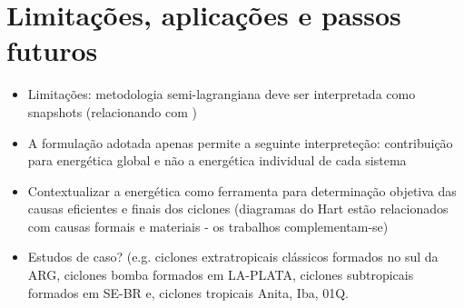 \section{Limitações, aplicações e passos futuros}
\begin{itemize}
    \item Limitações: metodologia semi-lagrangiana deve ser interpretada como snapshots (relacionando com \citet{muench1965dynamics})
    \item  A formulação adotada apenas permite a seguinte interpreteção: contribuição para energética global e não a energética individual de cada sistema
    \item Contextualizar a energética como ferramenta para determinação objetiva das causas eficientes e finais dos ciclones (diagramas do Hart estão relacionados com causas formais e materiais - os trabalhos complementam-se)
    \item Estudos de caso? (e.g. ciclones extratropicais clássicos formados no sul da ARG, ciclones bomba formados em LA-PLATA, ciclones subtropicais formados em SE-BR e, ciclones tropicais Anita, Iba, 01Q.
\end{itemize}